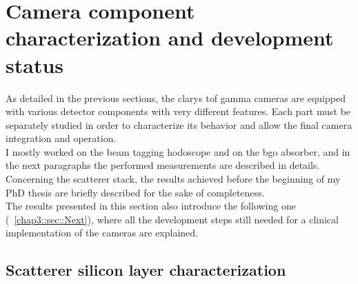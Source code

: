 
\section{Camera component characterization and development status}\label{chap3::sec::charMeasurements}

As detailed in the previous sections, the \gls{clarys} \gls{tof} gamma cameras are equipped with various detector components with very different features. Each part must be separately studied in order to characterize its behavior and allow the final camera integration and operation.\\
I mostly worked on the beam tagging hodoscope and on the \gls{bgo} absorber, and in the next paragraphs the performed measurements are described in details. Concerning the scatterer stack, the results achieved before the beginning of my PhD thesis are briefly described for the sake of completeness.\\
The results presented in this section also introduce the following one (~\ref{chap3::sec::Next}), where all the development steps still needed for a clinical implementation of the cameras are explained.\\

\subsection{Scatterer silicon layer characterization}\label{chap3::subsec::scattSichar}

